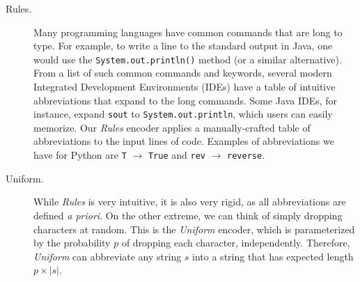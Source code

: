 \documentclass{article}
\begin{document}
\begin{description}
    \item[Rules. ]{Many programming languages have common commands that are long to type. For example, to write a line to the standard output in Java, one would use the \texttt{System.out.println()} method (or a similar alternative). From a list of such common commands and keywords, several modern Integrated Development Environments (IDEs) have
    a table of intuitive abbreviations that expand to
    the long commands. Some Java IDEs, for instance,
    expand \texttt{sout} to \texttt{System.out.println}, which users can easily memorize.
    Our \emph{Rules} encoder applies a manually-crafted
    table of abbreviations to the input lines of code.
    Examples of abbreviations we have for Python are
    \texttt{T} $\rightarrow$ \texttt{True} and
    \texttt{rev} $\rightarrow$ \texttt{reverse}.
    }

    \item[Uniform. ]{
    While \emph{Rules} is very intuitive, it is also
    very rigid, as all abbreviations are defined
    \emph{a priori}. On the other extreme, we can
    think of simply dropping characters at random.
    This is the \emph{Uniform} encoder, which is
    parameterized by the probability $p$ of dropping
    each character, independently. Therefore,
    \emph{Uniform} can abbreviate any string $s$
    into a string that has expected length $p \times |s|$.
    }


\end{description}
\end{document}
